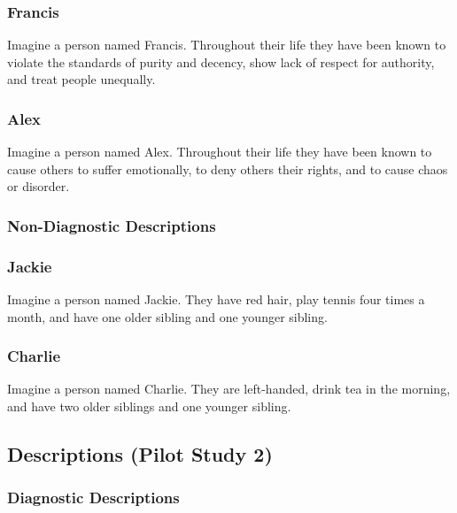 \documentclass[
  american,
  man,floatsintext]{apa7}
\begin{document}
\hypertarget{francis}{%
\subsubsection{Francis}\label{francis}}

Imagine a person named Francis.
Throughout their life they have been known to violate the standards of purity and decency, show lack of respect for authority, and treat people unequally.

\hypertarget{alex}{%
\subsubsection{Alex}\label{alex}}

Imagine a person named Alex.
Throughout their life they have been known to cause others to suffer emotionally, to deny others their rights, and to cause chaos or disorder.

\hypertarget{non-diagnostic-descriptions}{%
\subsubsection{Non-Diagnostic Descriptions}\label{non-diagnostic-descriptions}}

\hypertarget{jackie}{%
\subsubsection{Jackie}\label{jackie}}

Imagine a person named Jackie.
They have red hair, play tennis four times a month, and have one older sibling and one younger sibling.

\hypertarget{charlie}{%
\subsubsection{Charlie}\label{charlie}}

Imagine a person named Charlie.
They are left-handed, drink tea in the morning, and have two older siblings and one younger sibling.

\hypertarget{descriptions-pilot-study-2}{%
\subsection{Descriptions (Pilot Study 2)}\label{descriptions-pilot-study-2}}

\hypertarget{diagnostic-descriptions-1}{%
\subsubsection{Diagnostic Descriptions}\label{diagnostic-descriptions-1}}
\end{document}
